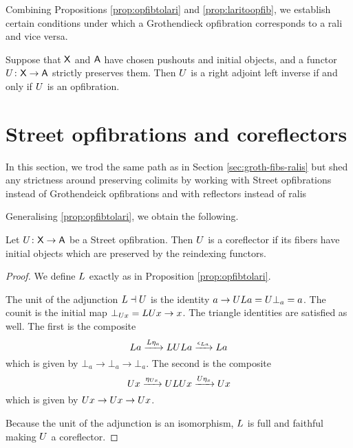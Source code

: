 \documentclass{amsart}
\begin{document}
Combining Propositions \ref{prop:opfibtolari} and \ref{prop:laritoopfib}, we establish certain conditions under which a Grothendieck opfibration corresponds to a rali and vice versa.

\begin{thm}\label{thm:mainthm}
  Suppose that $\mathsf{X}$ and $\mathsf{A}$ have chosen pushouts and initial objects,
  and a functor $U\colon\mathsf{X}\to\mathsf{A}$ strictly preserves them. Then $U$
  is a right adjoint left inverse if and only if $U$ is an
  opfibration.
\end{thm}


\section{Street opfibrations and coreflectors}\label{Streetfibs}

In this section, we trod the same path as in Section \ref{sec:groth-fibs-ralis} but shed any strictness around preserving colimits by working with Street opfibrations instead of Grothendeick opfibrations and with reflectors instead of ralis

Generalising \cref{prop:opfibtolari}, we obtain the following. 

\begin{prop} \label{thm:street-opfib-to-corefl}
  Let $ U \colon \mathsf{X} \to \mathsf{A} $ be a Street opfibration. Then $ U $ is a coreflector if its fibers have initial objects which are preserved by the reindexing functors.
\end{prop}

\begin{proof}
  We define $ L $ exactly as in Proposition
  \ref{prop:opfibtolari}. 

  The unit of the adjunction $ L \dashv U $ is the
  identity $ a\to UL a = U\bot_a = a $.  The
  counit is the initial map $ \bot_{U x} = LU x \to
  x $.  The triangle identities are satisfied as
  well. The first is the composite
  \[
    L a
    \xrightarrow{L\eta_a}        LUL a
    \xrightarrow{\epsilon_{L a}} L a
  \]
  which is given by $ \bot_a \to \bot_a \to \bot_a
  $.  The second is the composite
  \[
    U x
    \xrightarrow{\eta_{U x}} ULU x
    \xrightarrow{U\eta_x}    U x
  \]
  which is given by $ U x \to U x \to U x $.

  Because the unit of the adjunction is an
  isomorphism, $ L $ is full and faithful
  \cite[{Prop.~1.3}]{gabrielzisman} making $ U $ a
  coreflector.
\end{proof}
\end{document}
